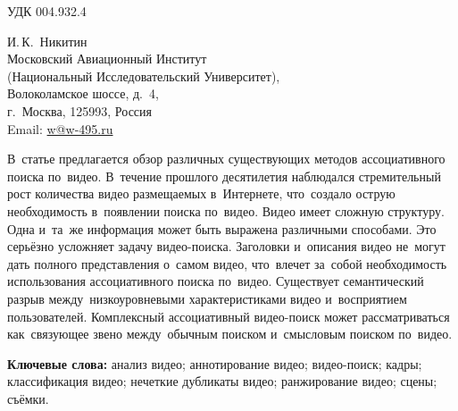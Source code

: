 
\noindent УДК 004.932.4

\begin{flushright}
\sf\small
И.\,К.~Никитин \\
Московский Авиационный Институт \\
(Национальный Исследовательский Университет), \\
Волоколамское шоссе, д.~4, \\
г.~Москва, 125993, Россия \\
Email: \href{mailto: w@w-495.ru}{w@w-495.ru}
\end{flushright}


В~статье предлагается обзор различных существующих методов
ассоциативного поиска по~видео.
В~течение прошлого десятилетия наблюдался стремительный рост
количества видео размещаемых в~Интернете,
что~создало острую необходимость в~появлении поиска по~видео.
Видео имеет сложную структуру. Одна и~та~же информация
может быть выражена различными способами.
Это серьёзно усложняет задачу видео-поиска.
Заголовки и~описания видео не~могут
дать полного представления о~самом видео,
что~влечет за~собой необходимость использования
ассоциативного поиска по~видео.
Существует семантический разрыв между~низкоуровневыми
характеристиками видео и~восприятием пользователей.
Комплексный ассоциативный видео-поиск
может рассматриваться как~связующее звено между~обычным поиском
и~смысловым поиском по~видео.

{\bf Ключевые слова:}
анализ видео;
аннотирование видео;
видео-поиск;
кадры;
классификация видео;
нечеткие дубликаты видео;
ранжирование видео;
сцены;
съёмки.
















